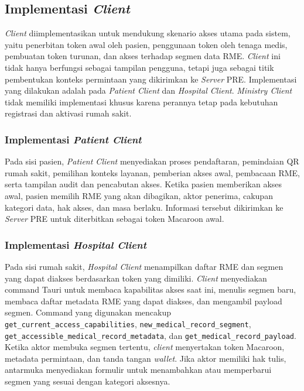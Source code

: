 \subsection{Implementasi \textit{Client}}
\label{subsec:implementasi-client}

\textit{Client} diimplementasikan untuk mendukung skenario akses utama pada sistem, yaitu penerbitan token awal oleh pasien, penggunaan token oleh tenaga medis, pembuatan token turunan, dan akses terhadap segmen data RME. \textit{Client} ini tidak hanya berfungsi sebagai tampilan pengguna, tetapi juga sebagai titik pembentukan konteks permintaan yang dikirimkan ke \textit{Server} PRE. Implementasi yang dilakukan adalah pada \textit{Patient Client} dan \textit{Hospital Client}. \textit{Ministry Client} tidak memiliki implementasi khusus karena perannya tetap pada kebutuhan registrasi dan aktivasi rumah sakit.

\subsubsection{Implementasi \textit{Patient Client}}
\label{subsec:implementasi-patient-client}

Pada sisi pasien, \textit{Patient Client} menyediakan proses pendaftaran, pemindaian QR rumah sakit, pemilihan konteks layanan, pemberian akses awal, pembacaan RME, serta tampilan audit dan pencabutan akses. Ketika pasien memberikan akses awal, pasien memilih RME yang akan dibagikan, aktor penerima, cakupan kategori data, hak akses, dan masa berlaku. Informasi tersebut dikirimkan ke \textit{Server} PRE untuk diterbitkan sebagai token Macaroon awal.

\subsubsection{Implementasi \textit{Hospital Client}}
\label{subsec:implementasi-hospital-client}

Pada sisi rumah sakit, \textit{Hospital Client} menampilkan daftar RME dan segmen yang dapat diakses berdasarkan token yang dimiliki. \textit{Client} menyediakan command Tauri untuk membaca kapabilitas akses saat ini, menulis segmen baru, membaca daftar metadata RME yang dapat diakses, dan mengambil payload segmen. Command yang digunakan mencakup \texttt{get\_current\_access\_capabilities}, \texttt{new\_medical\_record\_segment}, \texttt{get\_accessible\_medical\_record\_metadata}, dan \texttt{get\_medical\_record\_payload}. Ketika aktor membuka segmen tertentu, \textit{client} menyertakan token Macaroon, metadata permintaan, dan tanda tangan \textit{wallet}. Jika aktor memiliki hak tulis, antarmuka menyediakan formulir untuk menambahkan atau memperbarui segmen yang sesuai dengan kategori aksesnya.

